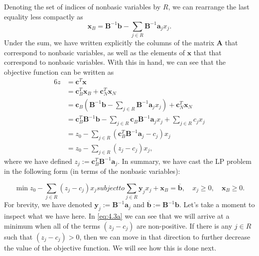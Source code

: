 \documentclass[12pt,english]{article}
\begin{document}
Denoting the set of indices of nonbasic variables by $R$, we can rearrange the last equality less compactly as
$$
\mathbf{x}_B = \mathbf{B}^{-1}\mathbf{b} - \sum_{j \in R} \mathbf{B}^{-1} \mathbf{a}_j x_j.
$$
Under the sum, we have written explicitly the columns of the matrix $\mathbf{A}$ that correspond to nonbasic variables, as well as the elements of $\mathbf{x}$ that that correspond to nonbasic variables.  With this in hand, we can see that the objective function can be written as
\begin{alignat*}{6}
z 		&= \mathbf{c}^T \mathbf{x} \\
		&= \mathbf{c}_B^T\mathbf{x}_B + \mathbf{c}_N^T \mathbf{x}_N \\
		&= \mathbf{c}_B \left( \mathbf{B}^{-1} \mathbf{b} - \sum_{j \in R} \mathbf{B}^{-1} \mathbf{a}_j x_j\right) + \mathbf{c}_N^T \mathbf{x}_N \\
		&= \mathbf{c}_B^T \mathbf{B}^{-1}\mathbf{b} - \sum_{j \in R} \mathbf{c}_B \mathbf{B}^{-1} \mathbf{a}_j x_j + \sum_{j \in R} c_j x_j \\
		&= z_0 - \sum_{j \in R} (\mathbf{c}_B^T \mathbf{B}^{-1} \mathbf{a}_j - c_j) x_j \\
		&= z_0 - \sum_{j \in R} (z_j -c_j)x_j, 
\end{alignat*}
where we have defined $z_j := \mathbf{c}_B^T \mathbf{B}^{-1} \mathbf{a}_j $.  In summary, we have cast the LP problem in the following form (in terms of the nonbasic variables):

\begin{subequations}\label{eq:4.3a}
\begin{equation}
\min z_0 - \sum_{j \in R} (z_j - c_j) x_j
\end{equation}
subject to
\begin{equation}\label{eq:4.3b}
\sum_{j \in R} \mathbf{y}_jx_j + \mathbf{x}_B = \overline{\mathbf{b}}, \quad x_j \geq 0, \quad \mathbf{x}_B \geq 0.
\end{equation}
\end{subequations}
For brevity, we have denoted $\mathbf{y}_j := \mathbf{B}^{-1} \mathbf{a}_j$ and $\overline{\mathbf{b}}:= \mathbf{B}^{-1}\mathbf{b}$.  Let's take a moment to inspect what we have here.  In \eqref{eq:4.3a} we can see that we will arrive at a minimum when all of the terms $(z_j - c_j)$ are non-positive.  If there is any $j \in R$ such that $(z_j - c_j) >0$, then we can move in that direction to further decrease the value of the objective function.  We will see how this is done next. \\
\end{document}
